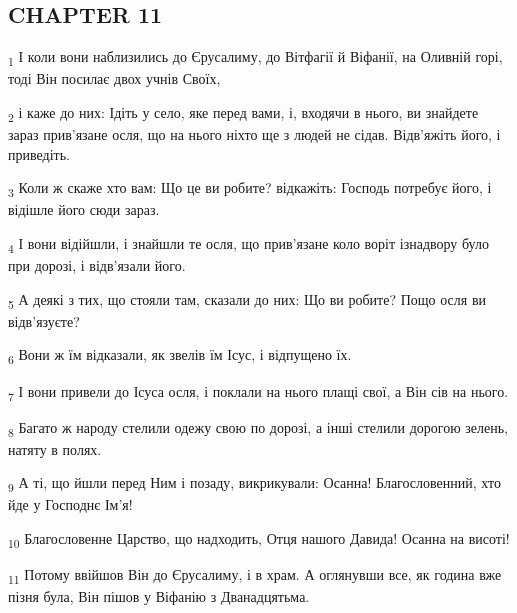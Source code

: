 \subsection{CHAPTER 11}
\begin{tcolorbox}
\textsubscript{1} І коли вони наблизились до Єрусалиму, до Вітфагії й Віфанії, на Оливній горі, тоді Він посилає двох учнів Своїх,
\end{tcolorbox}
\begin{tcolorbox}
\textsubscript{2} і каже до них: Ідіть у село, яке перед вами, і, входячи в нього, ви знайдете зараз прив'язане осля, що на нього ніхто ще з людей не сідав. Відв'яжіть його, і приведіть.
\end{tcolorbox}
\begin{tcolorbox}
\textsubscript{3} Коли ж скаже хто вам: Що це ви робите? відкажіть: Господь потребує його, і відішле його сюди зараз.
\end{tcolorbox}
\begin{tcolorbox}
\textsubscript{4} І вони відійшли, і знайшли те осля, що прив'язане коло воріт ізнадвору було при дорозі, і відв'язали його.
\end{tcolorbox}
\begin{tcolorbox}
\textsubscript{5} А деякі з тих, що стояли там, сказали до них: Що ви робите? Пощо осля ви відв'язуєте?
\end{tcolorbox}
\begin{tcolorbox}
\textsubscript{6} Вони ж їм відказали, як звелів їм Ісус, і відпущено їх.
\end{tcolorbox}
\begin{tcolorbox}
\textsubscript{7} І вони привели до Ісуса осля, і поклали на нього плащі свої, а Він сів на нього.
\end{tcolorbox}
\begin{tcolorbox}
\textsubscript{8} Багато ж народу стелили одежу свою по дорозі, а інші стелили дорогою зелень, натяту в полях.
\end{tcolorbox}
\begin{tcolorbox}
\textsubscript{9} А ті, що йшли перед Ним і позаду, викрикували: Осанна! Благословенний, хто йде у Господнє Ім'я!
\end{tcolorbox}
\begin{tcolorbox}
\textsubscript{10} Благословенне Царство, що надходить, Отця нашого Давида! Осанна на висоті!
\end{tcolorbox}
\begin{tcolorbox}
\textsubscript{11} Потому ввійшов Він до Єрусалиму, і в храм. А оглянувши все, як година вже пізня була, Він пішов у Віфанію з Дванадцятьма.
\end{tcolorbox}
